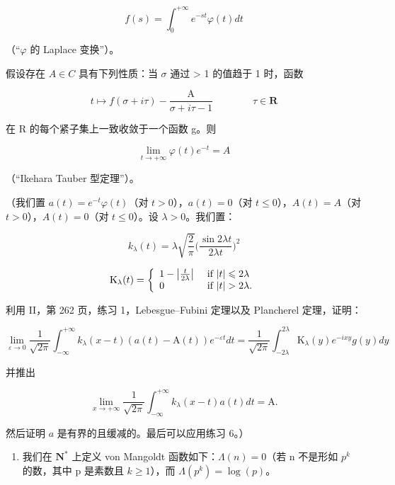 \[
f (s) = \int_ {0} ^ {+ \infty} e ^ {- s t} \varphi (t) d t
\]

（“\(\varphi\) 的 Laplace 变换”）。

假设存在 \(A \in C\) 具有下列性质：当 \(\sigma\) 通过 \textgreater{} 1 的值趋于 1 时，函数

\[
t \mapsto f (\sigma + i \tau) - \frac {\mathrm{A}}{\sigma + i \tau - 1} \qquad \qquad \tau \in \mathbf {R}
\]

在 R 的每个紧子集上一致收敛于一个函数 g。则

\[
\lim _ {t \to + \infty} \varphi (t) e ^ {- t} = A
\]

（“Ikehara Tauber 型定理”）。

（我们置 \(a(t) = e^{-t}\varphi(t)\)（对 \(t > 0\)），\(a(t) = 0\)（对 \(t \leqslant 0\)），\(A(t) = A\)（对 \(t > 0\)），\(A(t) = 0\)（对 \(t \leqslant 0\)）。设 \(\lambda > 0\)。我们置：

\[
k _ {\lambda} (t) = \lambda \sqrt {\frac {2}{\pi}} \Big (\frac {\sin 2 \lambda t}{2 \lambda t} \Big) ^ {2}
\]

\[
\mathrm{K} _ {\lambda} (t) = \left\{ \begin{array}{l l} 1 - \left| \frac {t}{2 \lambda} \right| & \text { if } | t | \leqslant 2 \lambda \\ 0 & \text { if } | t | > 2 \lambda . \end{array} \right.
\]

利用 II，第 262 页，练习 1，Lebesgue–Fubini 定理以及 Plancherel 定理，证明：

\[
\lim _ {\varepsilon \to 0} \frac {1}{\sqrt {2 \pi}} \int_ {- \infty} ^ {+ \infty} k _ {\lambda} (x - t) (a (t) - \mathrm{A} (t)) e ^ {- \varepsilon t} d t = \frac {1}{\sqrt {2 \pi}} \int_ {- 2 \lambda} ^ {2 \lambda} \mathrm{K} _ {\lambda} (y) e ^ {- i x y} g (y) d y
\]

并推出

\[
\lim _ {x \to + \infty} \frac {1}{\sqrt {2 \pi}} \int_ {- \infty} ^ {+ \infty} k _ {\lambda} (x - t) a (t) d t = \mathrm{A}.
\]

然后证明 \(a\) 是有界的且缓减的。最后可以应用练习 6。）

\begin{enumerate}
\def\labelenumi{\arabic{enumi})}
\setcounter{enumi}{9}
\tightlist
\item
  我们在 \(\mathbf{N}^{*}\) 上定义 von Mangoldt 函数如下：\(\Lambda(n)=0\)（若 n 不是形如 \(p^{k}\) 的数，其中 p 是素数且 \(k\geqslant1\)），而 \(\Lambda(p^{k})=\log(p)\)。
\end{enumerate}


